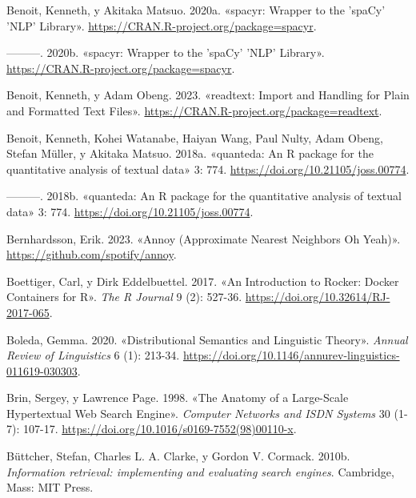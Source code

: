 \documentclass[
  12pt,
  openany]{book}
\newlength{\cslhangindent}
\newlength{\cslentryspacingunit} %
\newenvironment{CSLReferences}[2] %
 {%
  \setlength{\parindent}{0pt}
  \ifodd #1
  \let\oldpar\par
  \def\par{\hangindent=\cslhangindent\oldpar}
  \fi
  \setlength{\parskip}{#2\cslentryspacingunit}
 }%
 {}
\begin{document}
\begin{CSLReferences}{1}{0}
\leavevmode{}%
Benoit, Kenneth, y Akitaka Matsuo. 2020a. {«spacyr: Wrapper to the 'spaCy' 'NLP' Library»}. \url{https://CRAN.R-project.org/package=spacyr}.

\leavevmode{}%
---------. 2020b. {«spacyr: Wrapper to the 'spaCy' 'NLP' Library»}. \url{https://CRAN.R-project.org/package=spacyr}.

\leavevmode{}%
Benoit, Kenneth, y Adam Obeng. 2023. {«readtext: Import and Handling for Plain and Formatted Text Files»}. \url{https://CRAN.R-project.org/package=readtext}.

\leavevmode{}%
Benoit, Kenneth, Kohei Watanabe, Haiyan Wang, Paul Nulty, Adam Obeng, Stefan Müller, y Akitaka Matsuo. 2018a. {«quanteda: An R package for the quantitative analysis of textual data»} 3: 774. \url{https://doi.org/10.21105/joss.00774}.

\leavevmode{}%
---------. 2018b. {«quanteda: An R package for the quantitative analysis of textual data»} 3: 774. \url{https://doi.org/10.21105/joss.00774}.

\leavevmode{}%
Bernhardsson, Erik. 2023. {«Annoy (Approximate Nearest Neighbors Oh Yeah)»}. \url{https://github.com/spotify/annoy}.

\leavevmode{}%
Boettiger, Carl, y Dirk Eddelbuettel. 2017. {«An Introduction to Rocker: Docker Containers for R»}. \emph{The R Journal} 9 (2): 527-36. \url{https://doi.org/10.32614/RJ-2017-065}.

\leavevmode{}%
Boleda, Gemma. 2020. {«Distributional Semantics and Linguistic Theory»}. \emph{Annual Review of Linguistics} 6 (1): 213-34. \url{https://doi.org/10.1146/annurev-linguistics-011619-030303}.

\leavevmode{}%
Brin, Sergey, y Lawrence Page. 1998. {«The Anatomy of a Large-Scale Hypertextual Web Search Engine»}. \emph{Computer Networks and ISDN Systems} 30 (1-7): 107-17. \url{https://doi.org/10.1016/s0169-7552(98)00110-x}.

\leavevmode{}%
Büttcher, Stefan, Charles L. A. Clarke, y Gordon V. Cormack. 2010b. \emph{Information retrieval: implementing and evaluating search engines}. Cambridge, Mass: MIT Press.


\end{CSLReferences}
\end{document}
